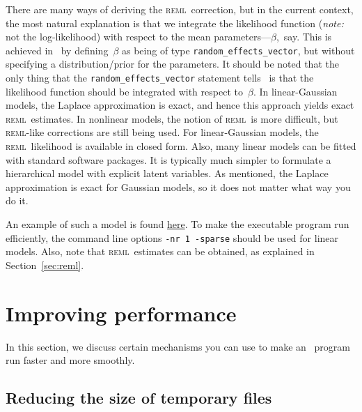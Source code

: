 \documentclass{admbmanual}
\newcommand{\scREML}{\textsc{reml}}
\begin{document}
There are many ways of deriving the \scREML\ correction, but in the current
context, the most natural explanation is that we integrate the likelihood
function (\textit{note:} not the log-likelihood) with respect to the mean
parameters---$\beta$,~say. This is achieved in \scAR\ by defining~$\beta$ as
being of type \texttt{random\_effects\_vector}, but without specifying a
distribution/prior for the parameters. It should be noted that the only thing
that the \texttt{random\_effects\_vector} statement tells \scAR\ is that the
likelihood function should be integrated with respect to~$\beta$. In
linear-Gaussian models, the Laplace approximation is exact, and hence this
approach yields exact \scREML\ estimates. In nonlinear models, the notion of
\scREML\ is more difficult, but \scREML-like corrections are still being used.
For linear-Gaussian models, the \scREML\ likelihood is available in closed form.
Also, many linear models can be fitted with standard software packages. It is
typically much simpler to formulate a hierarchical model with explicit latent
variables. As mentioned, the Laplace approximation is exact for Gaussian models,
so it does not matter what way you do it.

An example of such a model is found
\href{http://otter-rsch.com/admbre/examples/bcb/bcb.html}{here}. To make the
executable program run efficiently, the command line options
\texttt{-nr 1 -sparse} should be used for linear models. Also, note that
\scREML\ estimates can be obtained, as explained in Section~\ref{sec:reml}.

\section{Improving performance}
\label{sec:improving}

In this section, we discuss certain mechanisms you can use to make an \scAR\
program run faster and more smoothly.

\subsection{Reducing the size of temporary files}
\label{Memory_management}
\end{document}
